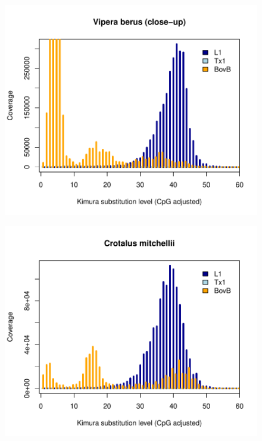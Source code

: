 \documentclass[12pt,a4paper,times]{article}
\begin{document}
\begin{figure}[H]
	\centering
	\includegraphics[scale=0.8]{suppFigures/divergencePlots/Vipera_berus_closeup.pdf}
	\caption{\label{Vipera_berus_closeup}}
\end{figure}

\begin{figure}[H]
	\centering
	\includegraphics[scale=0.8]{suppFigures/divergencePlots/Crotalus_mitchellii.pdf}
	\caption{\label{Crotalus_mitchellii}}
\end{figure}
\end{document}
